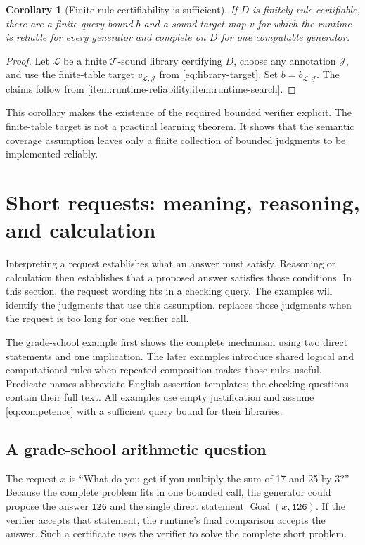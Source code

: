 \documentclass[11pt,twoside]{article}
\newtheorem{corollary}[theorem]{Corollary}
\theoremstyle{definition}
\newcommand{\True}{\mathcal T}
\newcommand{\Lib}{\mathcal L}
\newcommand{\Annot}{\mathcal J}
\newcommand{\Goal}{\operatorname{Goal}}
\begin{document}
\begin{corollary}[Finite-rule certifiability is sufficient]
\label{cor:certifiability-suffices}
If $D$ is finitely rule-certifiable, there are a finite query bound $b$ and a
sound target map $v$ for which the runtime is reliable for every generator and
complete on $D$ for one computable generator.
\end{corollary}
\begin{proof}
Let $\Lib$ be a finite $\True$-sound library certifying $D$, choose any
annotation $\Annot$, and use the finite-table target
$v_{\Lib,\Annot}$ from \cref{eq:library-target}. Set
$b=b_{\Lib,\Annot}$. The claims follow from
\cref{item:runtime-reliability,item:runtime-search}.
\end{proof}
This corollary makes the existence of the required bounded verifier explicit.
The finite-table target is not a practical learning theorem. It shows that the
semantic coverage assumption leaves only a finite collection of bounded
judgments to be implemented reliably.

\section{Short requests: meaning, reasoning, and calculation}
\label{sec:short-requests}

Interpreting a request establishes what an answer must satisfy. Reasoning
or calculation then establishes that a proposed answer satisfies those
conditions. In this section, the request wording fits in a checking query.
The examples will identify the judgments that use this assumption.
 replaces those judgments when the request is
too long for one verifier call.

The grade-school example first shows the complete mechanism using two direct
statements and one implication. The later examples introduce shared logical
and computational rules when repeated composition makes those rules useful.
Predicate names abbreviate English assertion templates; the checking questions
contain their full text. All examples use empty justification and assume
\cref{eq:competence} with a sufficient query bound for their libraries.

\subsection{A grade-school arithmetic question}
\label{sec:arithmetic-example}

The request $x$ is ``What do you get if you multiply the sum of 17 and 25 by
3?'' Because the complete problem fits in one bounded call, the generator
could propose the answer \texttt{126} and the single direct statement
$\Goal(x,\texttt{126})$. If the verifier accepts that statement, the runtime's
final comparison accepts the answer. Such a certificate uses the verifier to
solve the complete short problem.
\end{document}
